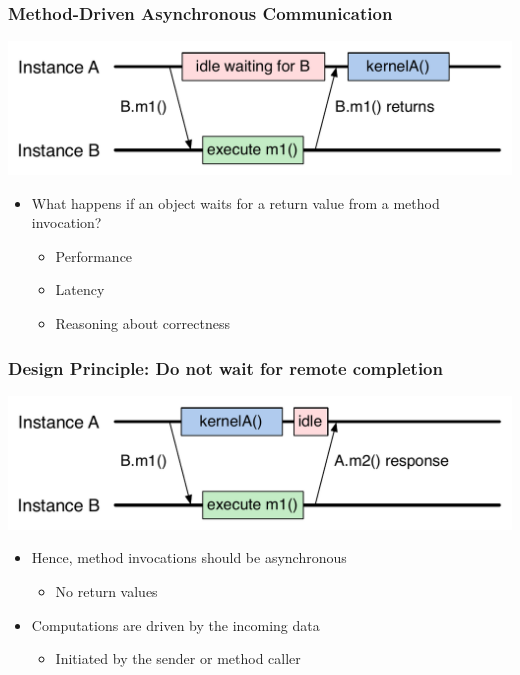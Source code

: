 \begin{frame}[fragile]
  \frametitle{Method-Driven Asynchronous Communication}
  \begin{center}
    \includegraphics[width=\textwidth]{figures/objectSequence.pdf}
  \end{center}
  \begin{itemize}
  \item What happens if an object waits for a return value from a method
    invocation?
    \begin{itemize}
    \item Performance
    \item Latency
    \item Reasoning about correctness
    \end{itemize}
  \end{itemize}
\end{frame}

\begin{frame}[fragile]
  \frametitle{Design Principle: Do not wait for remote completion}
  \begin{center}
    \includegraphics[width=\textwidth]{figures/objectSequenceAsync.pdf}
  \end{center}
  \begin{itemize}
  \item Hence, method invocations should be asynchronous
    \begin{itemize}
    \item No return values
    \end{itemize}
  \item Computations are driven by the incoming data
    \begin{itemize}
    \item Initiated by the sender or method caller
    \end{itemize}
  \end{itemize}
\end{frame}

